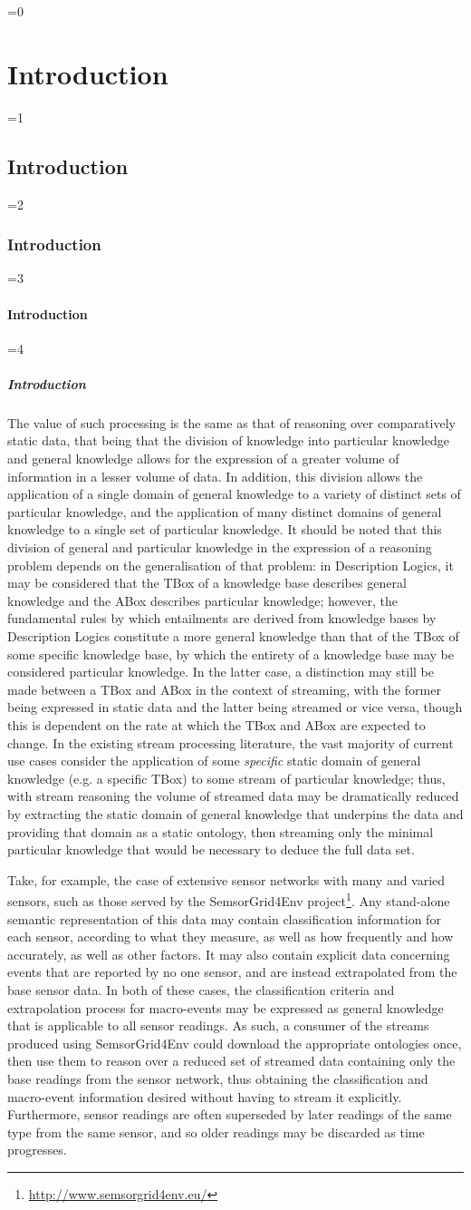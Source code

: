 \documentclass[twocolumn,preprint,3p,number]{elsarticle}
\theoremstyle{plain}
\theoremstyle{definition}
\newcounter{nestingdepth}
\newenvironment{nestedsection}[2]{
  \ifnum\value{nestingdepth}=0
    \chapter{#1}
  \else
    \ifnum\value{nestingdepth}=1
      \section{#1}
    \else
      \ifnum\value{nestingdepth}=2
        \subsection{#1}
      \else
        \ifnum\value{nestingdepth}=3
          \subsubsection{#1}
        \else
          \ifnum\value{nestingdepth}=4
            \paragraph{#1}
          \else
            \PackageError{nestedsections}{Maximum nesting level exceeded!}{uh oh!}
          \fi
        \fi
      \fi
    \fi
  \fi
  \addtocounter{nestingdepth}{1}
  \label{sec:#2}
}{\addtocounter{nestingdepth}{-1}}
\begin{document}
\begin{nestedsection}{Introduction}{intro}
  The value of such processing is the same as that of reasoning over comparatively static data, that being that the division of knowledge into particular knowledge and general knowledge allows for the expression of a greater volume of information in a lesser volume of data.
  In addition, this division allows the application of a single domain of general knowledge to a variety of distinct sets of particular knowledge, and the application of many distinct domains of general knowledge to a single set of particular knowledge.
  It should be noted that this division of general and particular knowledge in the expression of a reasoning problem depends on the generalisation of that problem:
  in Description Logics, it may be considered that the TBox of a knowledge base describes general knowledge and the ABox describes particular knowledge;
  however, the fundamental rules by which entailments are derived from knowledge bases by Description Logics constitute a more general knowledge than that of the TBox of some specific knowledge base, by which the entirety of a knowledge base may be considered particular knowledge.
  In the latter case, a distinction may still be made between a TBox and ABox in the context of streaming, with the former being expressed in static data and the latter being streamed or vice versa, though this is dependent on the rate at which the TBox and ABox are expected to change.
  In the existing stream processing literature, the vast majority of current use cases consider the application of some \emph{specific} static domain of general knowledge (e.g. a specific TBox) to some stream of particular knowledge;
  thus, with stream reasoning the volume of streamed data may be dramatically reduced by extracting the static domain of general knowledge that underpins the data and providing that domain as a static ontology, then streaming only the minimal particular knowledge that would be necessary to deduce the full data set.

  Take, for example, the case of extensive sensor networks with many and varied sensors, such as those served by the SemsorGrid4Env project\footnote{\url{http://www.semsorgrid4env.eu/}}.
  Any stand-alone semantic representation of this data may contain classification information for each sensor, according to what they measure, as well as how frequently and how accurately, as well as other factors.
  It may also contain explicit data concerning events that are reported by no one sensor, and are instead extrapolated from the base sensor data.
  In both of these cases, the classification criteria and extrapolation process for macro-events may be expressed as general knowledge that is applicable to all sensor readings.
  As such, a consumer of the streams produced using SemsorGrid4Env could download the appropriate ontologies once, then use them to reason over a reduced set of streamed data containing only the base readings from the sensor network, thus obtaining the classification and macro-event information desired without having to stream it explicitly.
  Furthermore, sensor readings are often superseded by later readings of the same type from the same sensor, and so older readings may be discarded as time progresses.


\end{nestedsection}
\end{document}
